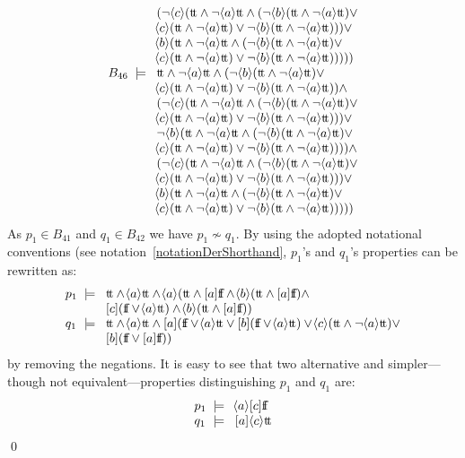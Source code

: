 \begin{example}
\[\begin{array}{l@{\;\;}c@{\;\;\;}l}
&&(\neg\can{c}(\dtt\wedge\neg\can{a}\dtt\wedge(\neg\can{b}(\dtt\wedge\neg\can{a}\dtt)\vee\\
&&\can{c}(\dtt\wedge\neg\can{a}\dtt)\vee\neg\can{b}(\dtt\wedge\neg\can{a}\dtt)))\vee\\
&&\can{b}(\dtt\wedge\neg\can{a}\dtt\wedge(\neg\can{b}(\dtt\wedge\neg\can{a}\dtt)\vee\\
&&\can{c}(\dtt\wedge\neg\can{a}\dtt)\vee\neg\can{b}(\dtt\wedge\neg\can{a}\dtt)))))\\
B_{46} &\models & \dtt \wedge \neg\can{a}\dtt \wedge(\neg\can{b}(\dtt\wedge\neg\can{a}\dtt)\vee\\
&&\can{c}(\dtt\wedge\neg\can{a}\dtt)\vee\neg\can{b}(\dtt\wedge\neg\can{a}\dtt))\wedge\\
&&(\neg\can{c}(\dtt\wedge\neg\can{a}\dtt\wedge(\neg\can{b}(\dtt\wedge\neg\can{a}\dtt)\vee\\
&&\can{c}(\dtt\wedge\neg\can{a}\dtt)\vee\neg\can{b}(\dtt\wedge\neg\can{a}\dtt)))\vee\\
&&\neg\can{b}(\dtt\wedge\neg\can{a}\dtt\wedge(\neg\can{b}(\dtt\wedge\neg\can{a}\dtt)\vee\\
&&\can{c}(\dtt\wedge\neg\can{a}\dtt)\vee\neg\can{b}(\dtt\wedge\neg\can{a}\dtt))))\wedge\\
&&(\neg\can{c}(\dtt\wedge\neg\can{a}\dtt\wedge(\neg\can{b}(\dtt\wedge\neg\can{a}\dtt)\vee\\
&&\can{c}(\dtt\wedge\neg\can{a}\dtt)\vee\neg\can{b}(\dtt\wedge\neg\can{a}\dtt)))\vee\\
&&\can{b}(\dtt\wedge\neg\can{a}\dtt\wedge(\neg\can{b}(\dtt\wedge\neg\can{a}\dtt)\vee\\
&&\can{c}(\dtt\wedge\neg\can{a}\dtt)\vee\neg\can{b}(\dtt\wedge\neg\can{a}\dtt)))))\\

\end{array}
\]
As $p_1\in B_{41}$ and $q_1\in B_{42}$ we have $p_1\not\sim q_1$. By using the adopted notational conventions (see notation~\ref{notationDerShorthand}, $p_1$'s and $q_1$'s properties can be rewritten as:
\[
\begin{array}{l@{\;\;}c@{\;\;\;}l}
p_1 & \models & \dtt\wedge\can{a}\dtt\wedge\can{a}(\dtt\wedge\may{a}\dff\wedge\can{b}(\dtt\wedge\may{a}\dff)\wedge\\
&&\may{c}(\dff\vee\can{a}\dtt)\wedge\can{b}(\dtt\wedge\may{a}\dff))\\
q_1 & \models & \dtt\wedge\can{a}\dtt\wedge\may{a}(\dff\vee\can{a}\dtt\vee\may{b}(\dff\vee\can{a}\dtt)\vee\can{c}(\dtt\wedge\neg\can{a}\dtt)\vee\\
&&\may{b}(\dff\vee\may{a}\dff))\\
\end{array}
\]
\noindent
by removing the negations. It is easy to see that two alternative and simpler---though not equivalent---properties distinguishing $p_1$ and $q_1$ are:
\[
\begin{array}{l@{\;\;}c@{\;\;\;}l}
p_1 & \models & \can{a}\may{c}\dff\\
q_1 & \models & \may{a}\can{c}\dtt\\
\end{array}
\]
\qed
\end{example}

